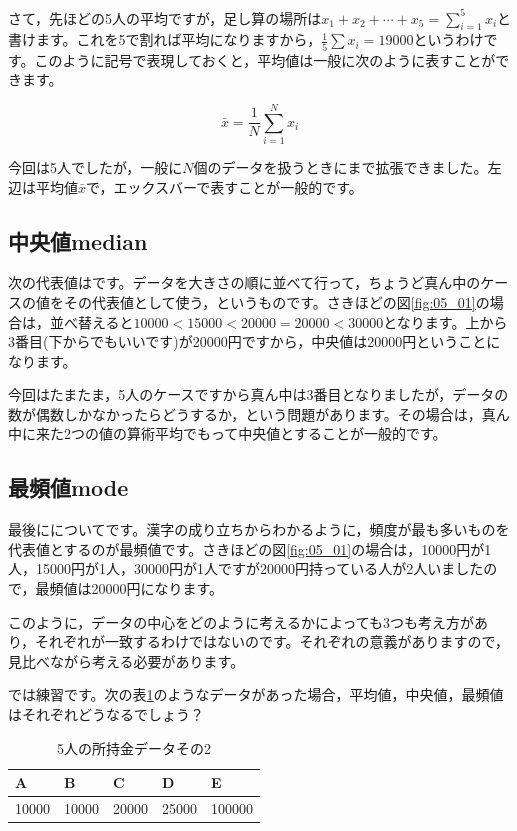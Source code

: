 \documentclass{ltjsbook}
\begin{document}
さて，先ほどの5人の平均ですが，足し算の場所は$x_1+x_2+\cdots+x_5=\sum_{i=1}^5 x_i$と書けます。これを5で割れば平均になりますから，$\frac{1}{5}\sum x_i = 19000$というわけです。このように記号で表現しておくと，平均値は一般に次のように表すことができます。

\[ \bar{x} = \frac{1}{N}\sum_{i=1}^N x_i \]

今回は5人でしたが，一般に$N$個のデータを扱うときにまで拡張できました。左辺は平均値$\bar{x}$で，エックスバーで表すことが一般的です。
\subsection{中央値median}
次の代表値はです。データを大きさの順に並べて行って，ちょうど真ん中のケースの値をその代表値として使う，というものです。さきほどの図\ref{fig:05_01}の場合は，並べ替えると$10000<15000<20000=20000<30000$となります。上から3番目(下からでもいいです)が20000円ですから，中央値は20000円ということになります。

今回はたまたま，5人のケースですから真ん中は3番目となりましたが，データの数が偶数しかなかったらどうするか，という問題があります。その場合は，真ん中に来た2つの値の算術平均でもって中央値とすることが一般的です。

\subsection{最頻値mode}
最後にについてです。漢字の成り立ちからわかるように，頻度が最も多いものを代表値とするのが最頻値です。さきほどの図\ref{fig:05_01}の場合は，10000円が1人，15000円が1人，30000円が1人ですが20000円持っている人が2人いましたので，最頻値は20000円になります。

このように，データの中心をどのように考えるかによっても3つも考え方があり，それぞれが一致するわけではないのです。それぞれの意義がありますので，見比べながら考える必要があります。

では練習です。次の表\ref{tbl:05_01}のようなデータがあった場合，平均値，中央値，最頻値はそれぞれどうなるでしょう？

\begin{table}[ht]
	\centering
	\caption{5人の所持金データその2}
	\begin{tabular}{lllll}
		A     & B     & C     & D     & E      \\\hline
		10000 & 10000 & 20000 & 25000 & 100000 \\
	\end{tabular}
	\label{tbl:05_01}
\end{table}
\end{document}

